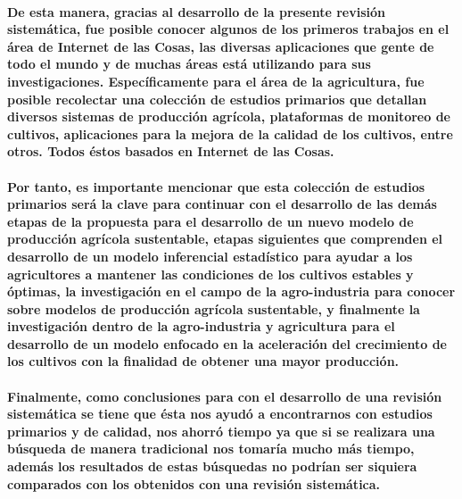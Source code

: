 \documentclass[10pt, twocolumn]{article}
\begin{document}
\paragraph{De esta manera, gracias al desarrollo de la presente revisión sistemática, fue posible conocer algunos de los primeros trabajos en el área de Internet de las Cosas, las diversas aplicaciones que gente de todo el mundo y de muchas áreas está utilizando para sus investigaciones. Específicamente para el área de la agricultura, fue posible recolectar una colección de estudios primarios que detallan diversos sistemas de producción agrícola, plataformas de monitoreo de cultivos, aplicaciones para la mejora de la calidad de los cultivos, entre otros. Todos éstos basados en Internet de las Cosas.}
\paragraph{Por tanto, es importante mencionar que esta colección de estudios primarios será la clave para continuar con el desarrollo de las demás etapas de la propuesta para el desarrollo de un nuevo modelo de producción agrícola sustentable, etapas siguientes que comprenden el desarrollo de un modelo inferencial estadístico para ayudar a los agricultores a mantener las condiciones de los cultivos estables y óptimas, la investigación en el campo de la agro-industria para conocer sobre modelos de producción agrícola sustentable, y finalmente la investigación dentro de la agro-industria y agricultura para el desarrollo de un modelo enfocado en la aceleración del crecimiento de los cultivos con la finalidad de obtener una mayor producción.}
\paragraph{Finalmente, como conclusiones para con el desarrollo de una revisión sistemática se tiene que ésta nos ayudó a encontrarnos con estudios primarios y de calidad, nos ahorró tiempo ya que si se realizara una búsqueda de manera tradicional nos tomaría mucho más tiempo, además los resultados de estas búsquedas no podrían ser siquiera comparados con los obtenidos con una revisión sistemática.}



\end{document}
